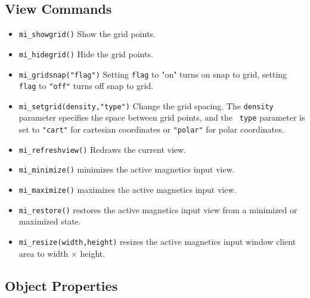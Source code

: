 \subsection{View Commands}

\begin{itemize}
\item{\verb+mi_showgrid()+} Show the grid points.
\item{\verb+mi_hidegrid()+} Hide the grid points.
\item{\verb+mi_gridsnap("flag")+}
Setting {\tt flag} to "on" turns on snap to grid, setting {\tt
flag} to {\tt "off"} turns off snap to grid.
\item{\verb+mi_setgrid(density,"type")+} Change the grid spacing.  The {\tt density}
parameter specifies the space between grid points, and the {\tt
type} parameter is set to {\tt "cart"} for cartesian coordinates or
{\tt "polar"} for polar coordinates.
\item{\tt mi\_refreshview()} Redraws the current view.
\item{\tt mi\_minimize()} minimizes the active magnetics input view.
\item{\tt mi\_maximize()} maximizes the active magnetics input view.
\item{\tt mi\_restore()} restores the active magnetics input view from a
 minimized or maximized state.
\item{\tt mi\_resize(width,height)} resizes the active magnetics input
 window client area to width $\times$ height.
\end{itemize}

\subsection{Object Properties}

